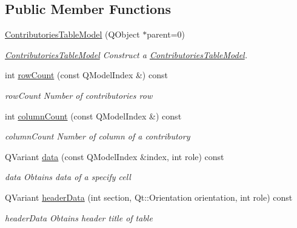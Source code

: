 \subsection*{Public Member Functions}
\begin{DoxyCompactItemize}
\item 
\hyperlink{classGui_1_1Widgets_1_1WdgModels_1_1ContributoriesTableModel_abfc7cdc96006729fa8b03571bb8b586b}{Contributories\-Table\-Model} (Q\-Object $\ast$parent=0)
\begin{DoxyCompactList}\small\item\em \hyperlink{classGui_1_1Widgets_1_1WdgModels_1_1ContributoriesTableModel}{Contributories\-Table\-Model} Construct a \hyperlink{classGui_1_1Widgets_1_1WdgModels_1_1ContributoriesTableModel}{Contributories\-Table\-Model}. \end{DoxyCompactList}\item 
int \hyperlink{classGui_1_1Widgets_1_1WdgModels_1_1ContributoriesTableModel_a4adfd94506448337ceac8504b76531aa}{row\-Count} (const Q\-Model\-Index \&) const 
\begin{DoxyCompactList}\small\item\em row\-Count Number of contributories row \end{DoxyCompactList}\item 
int \hyperlink{classGui_1_1Widgets_1_1WdgModels_1_1ContributoriesTableModel_ab052217cb08f856ecfe465458f95c174}{column\-Count} (const Q\-Model\-Index \&) const 
\begin{DoxyCompactList}\small\item\em column\-Count Number of column of a contributory \end{DoxyCompactList}\item 
Q\-Variant \hyperlink{classGui_1_1Widgets_1_1WdgModels_1_1ContributoriesTableModel_aa95bb13ea63275f96187150a8a2d3972}{data} (const Q\-Model\-Index \&index, int role) const 
\begin{DoxyCompactList}\small\item\em data Obtains data of a specify cell \end{DoxyCompactList}\item 
Q\-Variant \hyperlink{classGui_1_1Widgets_1_1WdgModels_1_1ContributoriesTableModel_ac08635d8660ddd4444d7f2b75ae3d0ef}{header\-Data} (int section, Qt\-::\-Orientation orientation, int role) const 
\begin{DoxyCompactList}\small\item\em header\-Data Obtains header title of table \end{DoxyCompactList}\item 

\end{DoxyCompactItemize}
